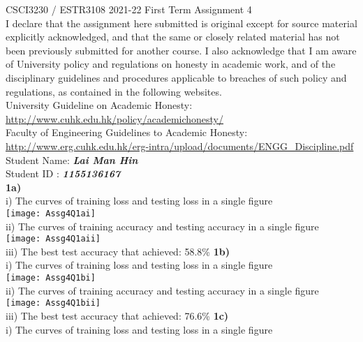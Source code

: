 \documentclass[12pt]{article}
\begin{document}
\thispagestyle{firstpage}
CSCI3230 / ESTR3108 2021-22 First Term Assignment 4\\
I declare that the assignment here submitted is original except for source material explicitly acknowledged, and that the same or closely related material has not been previously submitted for another course. I also acknowledge that I am aware of University policy and regulations on honesty in academic work, and
of the disciplinary guidelines and procedures applicable to breaches of such policy and regulations, as contained in the following websites.\\
University Guideline on Academic Honesty:\\
\url{http://www.cuhk.edu.hk/policy/academichonesty/}\\
Faculty of Engineering Guidelines to Academic Honesty:\\
\url{http://www.erg.cuhk.edu.hk/erg-intra/upload/documents/ENGG_Discipline.pdf}\\
Student Name: \textit{\textbf{Lai Man Hin}}\\
Student ID : \textit{\textbf{1155136167}}\\
\textbf{1a)}\\
\indent i) The curves of training loss and testing loss in a single figure\\
\texttt{[image: Assg4Q1ai]}\\
\indent ii) The curves of training accuracy and testing accuracy in a single figure\\
\texttt{[image: Assg4Q1aii]}\\
\indent iii) The best test accuracy that achieved: 58.8\%\newpage
{}
\textbf{1b)}\\
\indent i) The curves of training loss and testing loss in a single figure\\
\texttt{[image: Assg4Q1bi]}\\
\indent ii) The curves of training accuracy and testing accuracy in a single figure\\
\texttt{[image: Assg4Q1bii]}\\
\indent iii) The best test accuracy that achieved: 76.6\%\newpage
\textbf{1c)}\\
\indent i) The curves of training loss and testing loss in a single figure\\
\end{document}
